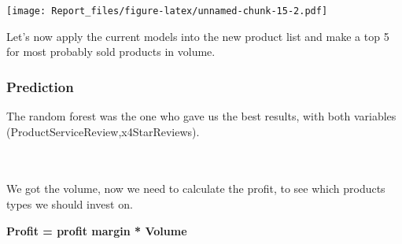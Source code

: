 \documentclass[]{article}
\newenvironment{Shaded}{\begin{snugshade}}{\end{snugshade}}
\newcommand{\KeywordTok}[1]{\textcolor[rgb]{0.13,0.29,0.53}{\textbf{#1}}}
\newcommand{\DataTypeTok}[1]{\textcolor[rgb]{0.13,0.29,0.53}{#1}}
\newcommand{\DecValTok}[1]{\textcolor[rgb]{0.00,0.00,0.81}{#1}}
\newcommand{\StringTok}[1]{\textcolor[rgb]{0.31,0.60,0.02}{#1}}
\newcommand{\OtherTok}[1]{\textcolor[rgb]{0.56,0.35,0.01}{#1}}
\newcommand{\OperatorTok}[1]{\textcolor[rgb]{0.81,0.36,0.00}{\textbf{#1}}}
\newcommand{\NormalTok}[1]{#1}
\begin{document}
\texttt{[image: Report\_files/figure-latex/unnamed-chunk-15-2.pdf]}

 Let's now apply the current models into the new product list and make a
top 5 for most probably sold products in volume.

\subsubsection{Prediction}\label{prediction}

 The random forest was the one who gave us the best results, with both
variables (ProductServiceReview,x4StarReviews).

\begin{Shaded}
\end{Shaded}

 \\
 \\
We got the volume, now we need to calculate the profit, to see which
products types we should invest on.

\textbf{Profit = profit margin * Volume}

 \\

\begin{Shaded}
\end{Shaded}
\end{document}
